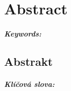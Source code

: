 \chapter*{Abstract}

\paragraph{Keywords:} 

\begin{otherlanguage}{czech}
\chapter*{Abstrakt}

\paragraph{Klíčová slova:} 
\end{otherlanguage}
